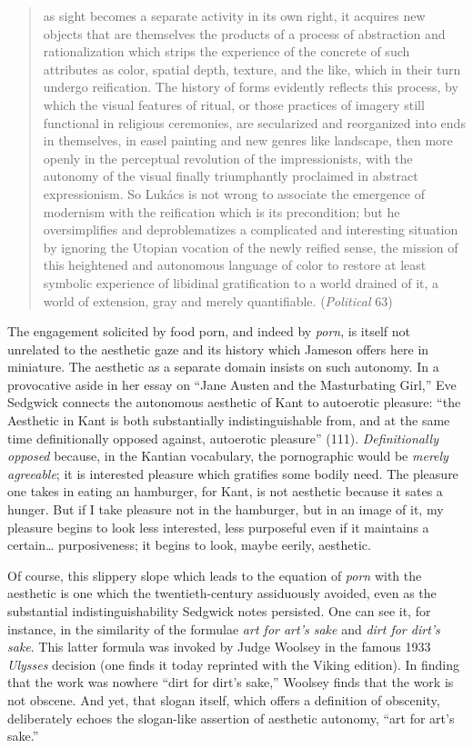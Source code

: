 \documentclass[
  12pt,
]{article}
\begin{document}
\begin{quote}
as sight becomes a separate activity in its own right, it acquires new
objects that are themselves the products of a process of abstraction and
rationalization which strips the experience of the concrete of such
attributes as color, spatial depth, texture, and the like, which in
their turn undergo reification. The history of forms evidently reflects
this process, by which the visual features of ritual, or those practices
of imagery still functional in religious ceremonies, are secularized and
reorganized into ends in themselves, in easel painting and new genres
like landscape, then more openly in the perceptual revolution of the
impressionists, with the autonomy of the visual finally triumphantly
proclaimed in abstract expressionism. So Lukács is not wrong to
associate the emergence of modernism with the reification which is its
precondition; but he oversimplifies and deproblematizes a complicated
and interesting situation by ignoring the Utopian vocation of the newly
reified sense, the mission of this heightened and autonomous language of
color to restore at least symbolic experience of libidinal gratification
to a world drained of it, a world of extension, gray and merely
quantifiable. (\emph{Political} 63)
\end{quote}

The engagement solicited by food porn, and indeed by \emph{porn}, is
itself not unrelated to the aesthetic gaze and its history which Jameson
offers here in miniature. The aesthetic as a separate domain insists on
such autonomy. In a provocative aside in her essay on ``Jane Austen and
the Masturbating Girl,'' Eve Sedgwick connects the autonomous aesthetic
of Kant to autoerotic pleasure: ``the Aesthetic in Kant is both
substantially indistinguishable from, and at the same time
definitionally opposed against, autoerotic pleasure'' (111).
\emph{Definitionally opposed} because, in the Kantian vocabulary, the
pornographic would be \emph{merely agreeable}; it is interested pleasure
which gratifies some bodily need. The pleasure one takes in eating an
hamburger, for Kant, is not aesthetic because it sates a hunger. But if
I take pleasure not in the hamburger, but in an image of it, my pleasure
begins to look less interested, less purposeful even if it maintains a
certain\ldots{} purposiveness; it begins to look, maybe eerily,
aesthetic.

Of course, this slippery slope which leads to the equation of
\emph{porn} with the aesthetic is one which the twentieth-century
assiduously avoided, even as the substantial indistinguishability
Sedgwick notes persisted. One can see it, for instance, in the
similarity of the formulae \emph{art for art's sake} and \emph{dirt for
dirt's sake}. This latter formula was invoked by Judge Woolsey in the
famous 1933 \emph{Ulysses} decision (one finds it today reprinted with
the Viking edition). In finding that the work was nowhere ``dirt for
dirt's sake,'' Woolsey finds that the work is not obscene. And yet, that
slogan itself, which offers a definition of obscenity, deliberately
echoes the slogan-like assertion of aesthetic autonomy, ``art for art's
sake.''
\end{document}
